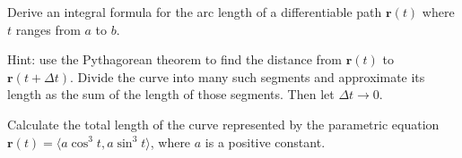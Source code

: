 \documentclass[svgnames]{watsonbook}
\begin{document}
\begin{exercise}{}{}
  Derive an integral formula for the arc length of a differentiable
  path $\mathbf{r}(t)$ where $t$ ranges from $a$ to $b$.

  Hint: use the Pythagorean theorem to find the distance from
  $\mathbf{r}(t)$ to $\mathbf{r}(t+\Delta t)$. Divide the curve into
  many such segments and approximate its length as the sum of the
  length of those segments. Then let $\Delta t \to 0$. 
\end{exercise}

\begin{exercise}{}{}
  Calculate the total length of the curve represented by the
  parametric equation $\mathbf{r}(t) = \langle a\cos^3t, a\sin^3 t \rangle$,
  where $a$ is a positive constant.
\end{exercise}
\end{document}
